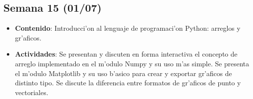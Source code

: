 \documentclass[letterpaper,11pt]{exam}
\begin{document}
\begin{multicols}{2}
\begin{scriptsize}
\subsection*{Semana 15 (01/07)}
\begin{itemize}
\item \textbf{Contenido}: Introducci'on al lenguaje de programaci'on Python: arreglos y gr'aficos. 
\item \textbf{Actividades}: Se presentan y discuten en forma interactiva el concepto de arreglo implementado en el m'odulo Numpy y su uso m'as simple. Se presenta el m'odulo Matplotlib y su uso b'asico para crear y exportar gr'aficos de distinto tipo. Se discute la diferencia entre formatos de gr'aficos de punto y vectoriales.
\end{itemize}
\end{scriptsize}
\end{multicols}
\end{document}
